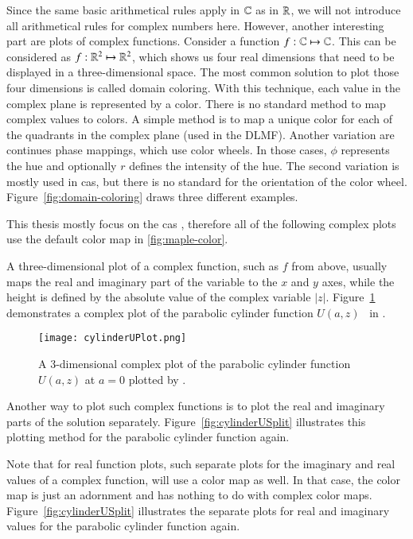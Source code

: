 Since the same basic arithmetical rules apply in $\mathbb{C}$ as in $\mathbb{R}$, we will not introduce all arithmetical rules for complex numbers here. However, another interesting part are plots of complex functions. Consider a function $f: \mathbb{C} \mapsto \mathbb{C}$. This can be considered as $f: \mathbb{R}^2 \mapsto \mathbb{R}^2$, which shows us four real dimensions that need to be displayed in a three-dimensional space. The most common solution to plot those four dimensions is called domain coloring. With this technique, each value in the complex plane is represented by a color. There is no standard method to map complex values to colors. A simple method is to map a unique color for each of the quadrants in the complex plane (used in the DLMF). Another variation are continues phase mappings, which use color wheels. In those cases, $\phi$ represents the hue and optionally $r$ defines the intensity of the hue. The second variation is mostly used in \gls{cas}, but there is no standard for the orientation of the color wheel. Figure~\ref{fig:domain-coloring} draws three different examples.

This thesis mostly focus on the \gls{cas} \Maple, therefore all of the following complex plots use the default color map in \Maple{~}\ref{fig:maple-color}.

A three-dimensional plot of a complex function, such as $f$ from above, usually maps the real and imaginary part of the variable to the $x$ and $y$ axes, while the height is defined by the absolute value of the complex variable $|z|$. Figure~\ref{fig:cylinderU} demonstrates a complex plot of the parabolic cylinder function $U(a,z)$~\cite[(12.2i)]{NIST:DLMF} in \Maple. 

\begin{figure}[ht]
	\centering
	\texttt{[image: cylinderUPlot.png]}
	\caption{A 3-dimensional complex plot of the parabolic cylinder function $U(a,z)$ at $a=0$ plotted by \Maple.~\cite[(12.2i)]{NIST:DLMF}}
	\label{fig:cylinderU}
\end{figure}

Another way to plot such complex functions is to plot the real and imaginary parts of the solution separately. Figure~\ref{fig:cylinderUSplit} illustrates this plotting method for the parabolic cylinder function again. 

Note that for real function plots, such separate plots for the imaginary and real values of a complex function, will use a color map as well. In that case, the color map is just an adornment and has nothing to do with complex color maps. Figure~\ref{fig:cylinderUSplit} illustrates the separate plots for real and imaginary values for the parabolic cylinder function again.

